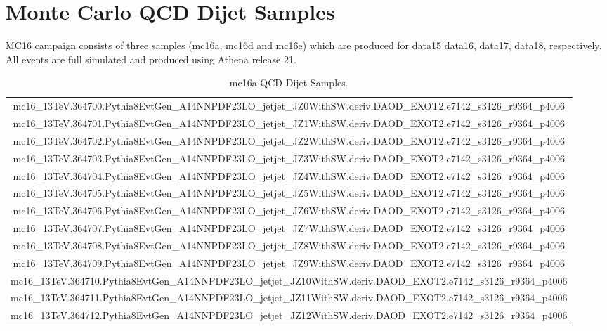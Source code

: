 \section{Monte Carlo QCD Dijet Samples}
\label{sec:qcdsample}

MC16 campaign consists of three samples (mc16a, mc16d and mc16e) which are produced for data15 data16, data17, data18, respectively. All events are full simulated and produced using Athena release 21.

\begin{sidewaystable}[htbp]
        \begin{center}
                \caption{mc16a QCD Dijet Samples.}
                \begin{tabular}{c}
		\hline
		mc16\_13TeV.364700.Pythia8EvtGen\_A14NNPDF23LO\_jetjet\_JZ0WithSW.deriv.DAOD\_EXOT2.e7142\_s3126\_r9364\_p4006 \\ 
		mc16\_13TeV.364701.Pythia8EvtGen\_A14NNPDF23LO\_jetjet\_JZ1WithSW.deriv.DAOD\_EXOT2.e7142\_s3126\_r9364\_p4006 \\ 
		mc16\_13TeV.364702.Pythia8EvtGen\_A14NNPDF23LO\_jetjet\_JZ2WithSW.deriv.DAOD\_EXOT2.e7142\_s3126\_r9364\_p4006 \\ 
		mc16\_13TeV.364703.Pythia8EvtGen\_A14NNPDF23LO\_jetjet\_JZ3WithSW.deriv.DAOD\_EXOT2.e7142\_s3126\_r9364\_p4006 \\ 
		mc16\_13TeV.364704.Pythia8EvtGen\_A14NNPDF23LO\_jetjet\_JZ4WithSW.deriv.DAOD\_EXOT2.e7142\_s3126\_r9364\_p4006 \\ 
		mc16\_13TeV.364705.Pythia8EvtGen\_A14NNPDF23LO\_jetjet\_JZ5WithSW.deriv.DAOD\_EXOT2.e7142\_s3126\_r9364\_p4006 \\ 
		mc16\_13TeV.364706.Pythia8EvtGen\_A14NNPDF23LO\_jetjet\_JZ6WithSW.deriv.DAOD\_EXOT2.e7142\_s3126\_r9364\_p4006 \\ 
		mc16\_13TeV.364707.Pythia8EvtGen\_A14NNPDF23LO\_jetjet\_JZ7WithSW.deriv.DAOD\_EXOT2.e7142\_s3126\_r9364\_p4006 \\ 
		mc16\_13TeV.364708.Pythia8EvtGen\_A14NNPDF23LO\_jetjet\_JZ8WithSW.deriv.DAOD\_EXOT2.e7142\_s3126\_r9364\_p4006 \\ 
		mc16\_13TeV.364709.Pythia8EvtGen\_A14NNPDF23LO\_jetjet\_JZ9WithSW.deriv.DAOD\_EXOT2.e7142\_s3126\_r9364\_p4006 \\
		mc16\_13TeV.364710.Pythia8EvtGen\_A14NNPDF23LO\_jetjet\_JZ10WithSW.deriv.DAOD\_EXOT2.e7142\_s3126\_r9364\_p4006 \\
		mc16\_13TeV.364711.Pythia8EvtGen\_A14NNPDF23LO\_jetjet\_JZ11WithSW.deriv.DAOD\_EXOT2.e7142\_s3126\_r9364\_p4006 \\
		mc16\_13TeV.364712.Pythia8EvtGen\_A14NNPDF23LO\_jetjet\_JZ12WithSW.deriv.DAOD\_EXOT2.e7142\_s3126\_r9364\_p4006 \\
		\hline
                \end{tabular}
        \end{center}
\end{sidewaystable}

